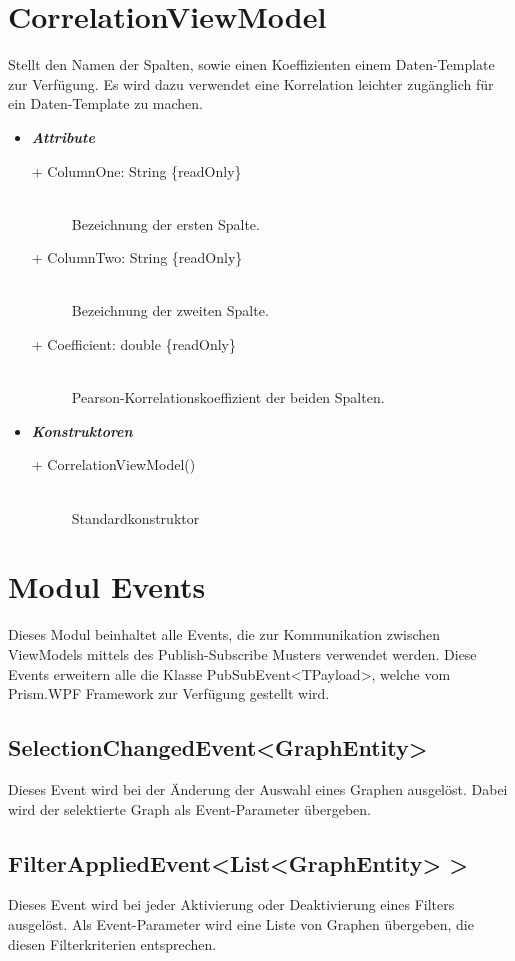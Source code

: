 \documentclass[13pt]{scrreprt}
\begin{document}
	\section{CorrelationViewModel}
	Stellt den Namen der Spalten, sowie einen Koeffizienten einem Daten-Template zur Verf\"ugung. Es wird dazu verwendet eine Korrelation leichter zug\"anglich f\"ur ein Daten-Template zu machen.
	\begin{itemize}[label = {$\circ$}]
		\item {\large \textbf{\textit{Attribute}}\par}
		\begin{description}
			\item [+ ColumnOne: String \{readOnly\}] \hfill \\ Bezeichnung der ersten Spalte.
			\item [+ ColumnTwo: String \{readOnly\}] \hfill \\ Bezeichnung der zweiten Spalte.
			\item [+ Coefficient: double \{readOnly\}] \hfill \\ Pearson-Korrelationskoeffizient der beiden Spalten.
		\end{description}
		\item {\large \textbf{\textit{Konstruktoren}}\par}
		\begin{description}
			\item [+  CorrelationViewModel()] \hfill \\ Standardkonstruktor
		\end{description}
	\end{itemize}
	
	\section{Modul Events}
	Dieses Modul beinhaltet alle Events, die zur Kommunikation zwischen ViewModels mittels des Publish-Subscribe Musters verwendet werden. Diese Events erweitern alle die Klasse PubSubEvent<TPayload>, welche vom Prism.WPF Framework zur Verf\"ugung gestellt wird.
	
	\subsection{SelectionChangedEvent<GraphEntity>}
	Dieses Event wird bei der \"Anderung der Auswahl eines Graphen ausgel\"ost. Dabei wird der selektierte Graph als Event-Parameter \"ubergeben.
	\subsection {FilterAppliedEvent<List<GraphEntity> >}
	Dieses Event wird bei jeder Aktivierung oder Deaktivierung eines Filters ausgel\"ost. Als Event-Parameter wird eine Liste von Graphen \"ubergeben, die diesen Filterkriterien entsprechen.
\end{document}
